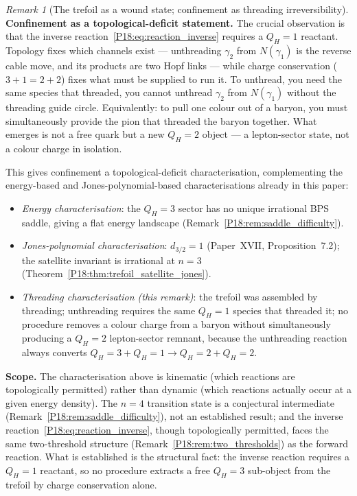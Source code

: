 \documentclass[11pt,a4paper]{article}
\theoremstyle{definition}\newtheorem{definition}[theorem]{Definition}
\theoremstyle{remark}
\newtheorem{remark}[theorem]{Remark}
\newcommand{\QH}{Q_H}
\newcommand{\dimq}[1]{d_{#1}}
\begin{document}
\begin{remark}[The trefoil as a wound state; confinement as threading irreversibility]
\textbf{Confinement as a topological-deficit statement.}
The crucial observation is that the inverse
reaction~\eqref{P18:eq:reaction_inverse} requires a $\QH=1$
reactant.  Topology fixes which channels exist --- unthreading
$\gamma_2$ from $N(\gamma_1)$ is the reverse cable move, and its
products are two Hopf links --- while charge conservation
($3+1=2+2$) fixes what must be supplied to run it.  To unthread, you need the
same species that threaded, you cannot unthread $\gamma_2$ from $N(\gamma_1)$
without the threading guide circle. Equivalently: to pull one colour
out of a baryon, you must simultaneously provide the pion that
threaded the baryon together.  What emerges is not a free quark
but a new $\QH=2$ object --- a lepton-sector state, not a colour
charge in isolation.

This gives confinement a topological-deficit characterisation,
complementing the energy-based and Jones-polynomial-based
characterisations already in this paper:
\begin{itemize}[noitemsep]
\item \emph{Energy characterisation}: the $\QH=3$ sector has no
  unique irrational BPS saddle, giving a flat energy landscape
  (Remark~\ref{P18:rem:saddle_difficulty}).
\item \emph{Jones-polynomial characterisation}: $\dimq{3/2}=1$
  (Paper~XVII, Proposition~7.2); the satellite invariant is
  irrational at $n=3$ (Theorem~\ref{P18:thm:trefoil_satellite_jones}).
\item \emph{Threading characterisation (this remark)}: the trefoil
  was assembled by threading; unthreading requires the same
  $\QH=1$ species that threaded it; no procedure removes a
  colour charge from a baryon without simultaneously producing
  a $\QH=2$ lepton-sector remnant, because the unthreading
  reaction always converts $\QH=3+\QH=1\to\QH=2+\QH=2$.
\end{itemize}

\textbf{Scope.}
The characterisation above is kinematic (which reactions are
topologically permitted) rather than dynamic (which reactions
actually occur at a given energy density).  The $n=4$ transition
state is a conjectural intermediate (Remark~\ref{P18:rem:saddle_difficulty}),
not an established result; and the inverse
reaction~\eqref{P18:eq:reaction_inverse}, though topologically
permitted, faces the same two-threshold structure
(Remark~\ref{P18:rem:two_thresholds}) as the forward reaction.
What is established is the structural fact: the inverse reaction
requires a $\QH=1$ reactant, so no procedure extracts a free
$\QH=3$ sub-object from the trefoil by charge conservation alone.
\end{remark}
\end{document}

